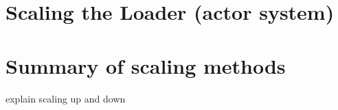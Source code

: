 \section{Scaling the Loader (actor system)}
\label{sec:scaling-akka}




\section{Summary of scaling methods}
\label{sec:scaling-summary}

explain scaling up and down

